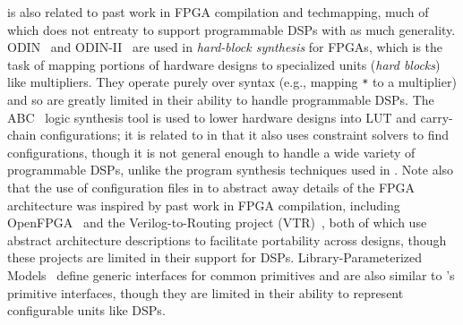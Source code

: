\lr is also related to past work in FPGA compilation and techmapping,
  much of which does not 
  entreaty to support
  programmable DSPs with as much generality.
ODIN~\cite{jamieson2005verilog} and ODIN-II~\cite{jamieson2010odin}
  are used in \textit{hard-block synthesis}
  for FPGAs,
  which is the task of mapping portions
  of hardware designs to specialized units (\textit{hard blocks}) like multipliers.
They operate purely over syntax (e.g., mapping \texttt{*} to a multiplier)
  and so are greatly limited in their ability
  to handle programmable DSPs.
The ABC~\cite{brayton2010abc} logic synthesis tool
  is used to lower hardware designs 
  into LUT and carry-chain configurations; it 
  is related to \lr in that it also uses constraint solvers
  to find configurations,
  though it is not general enough to handle
  a wide variety of programmable DSPs,
  unlike the program synthesis techniques used in \lr.
Note also that the use of
  configuration files in \lr to
  abstract away details of the FPGA architecture
  was inspired by past work in FPGA compilation,
  including OpenFPGA~\cite{tang2019openfpga}
  and the Verilog-to-Routing
  project (VTR)~\cite{rose2012vtr},
  both of which use abstract architecture descriptions
  to facilitate portability across designs,
  though these projects are limited in their support for DSPs.
Library-Parameterized Models~\cite{1993lpm, lpmaltera}
  define generic interfaces for common primitives and are also similar to \lr's primitive interfaces,
  though they are limited in their ability to represent configurable units like DSPs.\tighten


  




